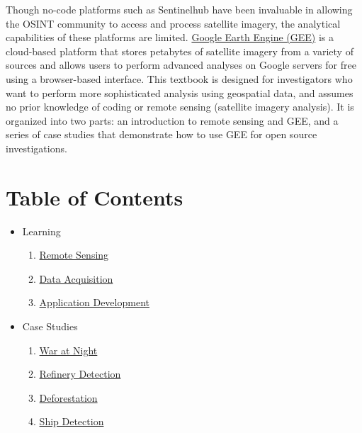 \documentclass[
  letterpaper,
  DIV=11,
  numbers=noendperiod]{scrreprt}
\providecommand{\tightlist}{%
  \setlength{\itemsep}{0pt}\setlength{\parskip}{0pt}}\usepackage{longtable,booktabs,array}
\begin{document}
Though no-code platforms such as Sentinelhub have been invaluable in
allowing the OSINT community to access and process satellite imagery,
the analytical capabilities of these platforms are limited.
\href{https://earthengine.google.com/\#intro}{Google Earth Engine (GEE)}
is a cloud-based platform that stores petabytes of satellite imagery
from a variety of sources and allows users to perform advanced analyses
on Google servers for free using a browser-based interface. This
textbook is designed for investigators who want to perform more
sophisticated analysis using geospatial data, and assumes no prior
knowledge of coding or remote sensing (satellite imagery analysis). It
is organized into two parts: an introduction to remote sensing and GEE,
and a series of case studies that demonstrate how to use GEE for open
source investigations.

\hypertarget{table-of-contents}{%
\section*{Table of Contents}\label{table-of-contents}}


\begin{itemize}
\tightlist
\item
  Learning

  \begin{enumerate}
  \def\labelenumi{\arabic{enumi}.}
  \tightlist
  \item
    \protect\hyperlink{remote-sensing}{Remote Sensing}
  \item
    \protect\hyperlink{data-acquisition}{Data Acquisition}
  \item
    \href{ch4.qmd}{Application Development}
  \end{enumerate}
\item
  Case Studies

  \begin{enumerate}
  \def\labelenumi{\arabic{enumi}.}
  \tightlist
  \item
    \protect\hyperlink{war-at-night}{War at Night}
  \item
    \protect\hyperlink{refinery-detection}{Refinery Detection}
  \item
    \href{trees.qmd}{Deforestation}
  \item
    \protect\hyperlink{refinery-detection-1}{Ship Detection}
  \end{enumerate}
\end{itemize}
\end{document}
